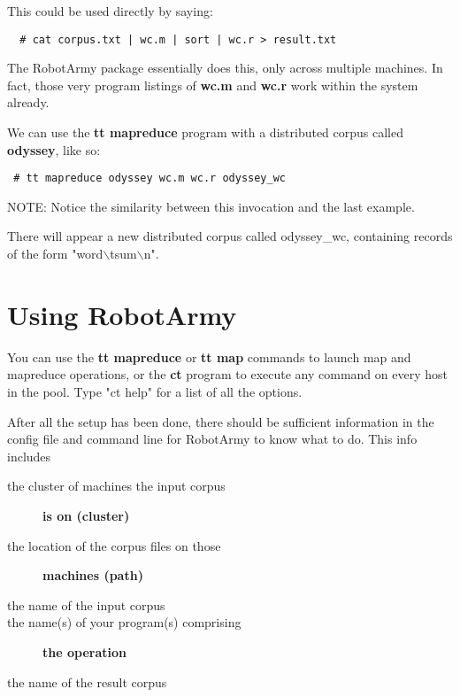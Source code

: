 \documentclass{tufte-handout}
\begin{document}
This could be used directly by saying:

\begin{verbatim}
  # cat corpus.txt | wc.m | sort | wc.r > result.txt
\end{verbatim}


The RobotArmy package essentially does this, only across multiple machines. In fact, those very program listings of \textbf{wc.m} and \textbf{wc.r} work within the system already.



We can use the \textbf{tt mapreduce} program with a distributed corpus called \textbf{odyssey}, like so:

\begin{verbatim}
 # tt mapreduce odyssey wc.m wc.r odyssey_wc
\end{verbatim}


NOTE: Notice the similarity between this invocation and the last example.



There will appear a new distributed corpus called odyssey\_wc, containing records of the form "word$\backslash$tsum$\backslash$n".

\section{Using RobotArmy\label{Using_RobotArmy}}


You can use the \textbf{tt mapreduce} or \textbf{tt map} commands to launch map and mapreduce operations, or the \textbf{ct} program to execute any command on every host in the pool. Type "ct help" for a list of all the options.



After all the setup has been done, there should be sufficient information in the config file and command line for RobotArmy to know what to do. This info includes

\begin{description}

\item[{the cluster of machines the input corpus}] \textbf{is on (\textbf{cluster})}
\item[{the location of the corpus files on those}] \textbf{machines (\textbf{path})}
\item[{the name of the input corpus}] \mbox{}
\item[{the name(s) of your program(s) comprising}] \textbf{the operation}
\item[{the name of the result corpus}] \mbox{}\end{description}
\end{document}
